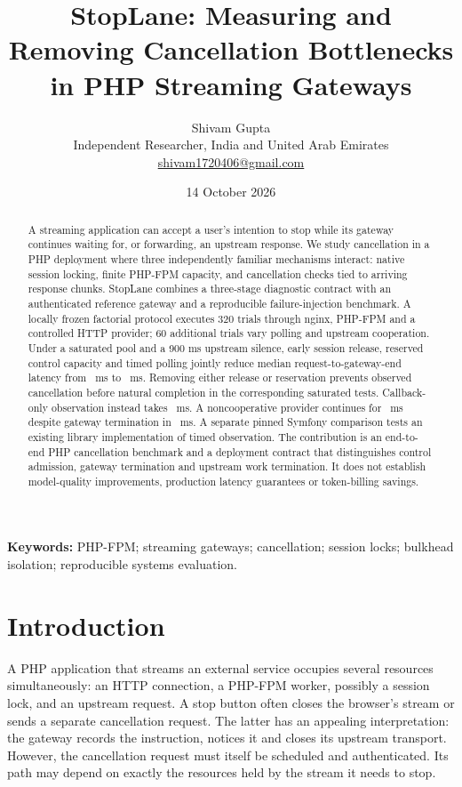 \documentclass[11pt,a4paper]{article}
\title{\textbf{StopLane: Measuring and Removing Cancellation Bottlenecks in PHP Streaming Gateways}}
\author{Shivam Gupta\\\small Independent Researcher, India and United Arab Emirates\\\small\href{mailto:shivam1720406@gmail.com}{shivam1720406@gmail.com}}
\date{14 October 2026}
\begin{document}
\maketitle
\begin{abstract}
A streaming application can accept a user's intention to stop while its gateway continues waiting for, or forwarding, an upstream response. We study cancellation in a PHP deployment where three independently familiar mechanisms interact: native session locking, finite PHP-FPM capacity, and cancellation checks tied to arriving response chunks. StopLane combines a three-stage diagnostic contract with an authenticated reference gateway and a reproducible failure-injection benchmark. A locally frozen factorial protocol executes 320 trials through nginx, PHP-FPM and a controlled HTTP provider; 60 additional trials vary polling and upstream cooperation. Under a saturated pool and a 900 ms upstream silence, early session release, reserved control capacity and timed polling jointly reduce median request-to-gateway-end latency from \BaselineGateway\ ms to \GoodGateway\ ms. Removing either release or reservation prevents observed cancellation before natural completion in the corresponding saturated tests. Callback-only observation instead takes \CallbackGateway\ ms. A noncooperative provider continues for \UncoopProvider\ ms despite gateway termination in \UncoopGateway\ ms. A separate pinned Symfony comparison tests an existing library implementation of timed observation. The contribution is an end-to-end PHP cancellation benchmark and a deployment contract that distinguishes control admission, gateway termination and upstream work termination. It does not establish model-quality improvements, production latency guarantees or token-billing savings.
\end{abstract}
\textbf{Keywords:} PHP-FPM; streaming gateways; cancellation; session locks; bulkhead isolation; reproducible systems evaluation.

\section{Introduction}
A PHP application that streams an external service occupies several resources simultaneously: an HTTP connection, a PHP-FPM worker, possibly a session lock, and an upstream request. A stop button often closes the browser's stream or sends a separate cancellation request. The latter has an appealing interpretation: the gateway records the instruction, notices it and closes its upstream transport. However, the cancellation request must itself be scheduled and authenticated. Its path may depend on exactly the resources held by the stream it needs to stop.
\end{document}
